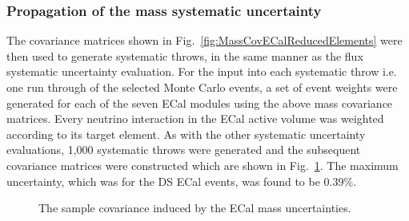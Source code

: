 \subsubsection{Propagation of the mass systematic uncertainty}
\label{subsubsec:ECalMassSystematicPropagation}
The covariance matrices shown in Fig.~\ref{fig:MassCovECalReducedElements} were then used to generate systematic throws, in the same manner as the flux systematic uncertainty evaluation.  For the input into each systematic throw i.e. one run through of the selected Monte Carlo events, a set of event weights were generated for each of the seven ECal modules using the above mass covariance matrices.  Every neutrino interaction in the ECal active volume was weighted according to its target element.  As with the other systematic uncertainty evaluations, 1,000 systematic throws were generated and the subsequent covariance matrices were constructed which are shown in Fig.~\ref{fig:ECalMassCovarianceMatrices}.  The maximum uncertainty, which was for the DS ECal events, was found to be $0.39\%$. 
\begin{figure}%
  \centering
  \caption{The sample covariance induced by the ECal mass uncertainties.}
  \label{fig:ECalMassCovarianceMatrices}
\end{figure}

